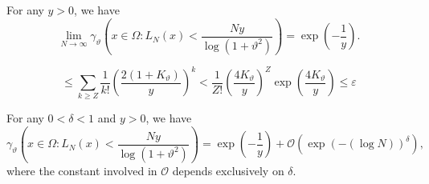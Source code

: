 \documentclass[10pt,a4paper]{amsart}
\begin{document}
\begin{theorem} \label{Th.4.4}
For any \( y > 0 \), we have
\begin{equation} \label{4.0700}
\lim_{N \to \infty} \gamma_{\vartheta}\left( x \in \Omega: L_N(x) < \frac{N y}{\log(1+\vartheta^2)} \right) = \exp\left( -\frac{1}{y}\right).
\end{equation}
\end{theorem}

\begin{equation} \label{4.0800} 
\leq \sum_{k \geq Z} \frac{1}{k!} \left( \frac{2(1+K_{\vartheta})}{y} \right)^k < \frac{1}{Z!} \left( \frac{4K_{\vartheta}}{y} \right)^Z \exp\left( \frac{4K_{\vartheta}}{y} \right) \leq \varepsilon
\end{equation}

\begin{theorem} \label{Th.4.5}
For any $0<\delta <1$ and $y>0$, we have
%
\begin{equation} \label{4.11}
\gamma_{\vartheta}\left( x \in \Omega: L_N(x) < \frac{N y}{\log\left(1+\vartheta^2 \right) } \right) = \exp\left( -\frac{1}{y}\right) +\mathcal{O}\left( \exp\left( -(\log N)\right)^{\delta} \right),
\end{equation}
where the constant involved in $\mathcal{O}$ depends exclusively on $\delta$.
%
\end{theorem}
\end{document}
